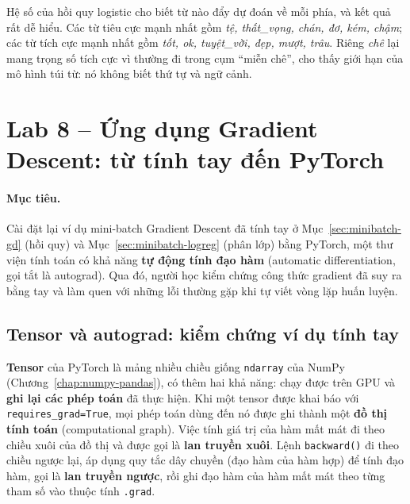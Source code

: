 
Hệ số của hồi quy logistic cho biết từ nào đẩy dự đoán về mỗi phía, và kết quả rất dễ hiểu. Các từ tiêu cực mạnh nhất gồm \textit{tệ, thất\_vọng, chán, đơ, kém, chậm}; các từ tích cực mạnh nhất gồm \textit{tốt, ok, tuyệt\_vời, đẹp, mượt, trâu}. Riêng \textit{chê} lại mang trọng số tích cực vì thường đi trong cụm ``miễn chê'', cho thấy giới hạn của mô hình túi từ: nó không biết thứ tự và ngữ cảnh.

\section{Lab 8 -- Ứng dụng Gradient Descent: từ tính tay đến PyTorch}
\label{sec:lab-gd}

\paragraph{Mục tiêu.} Cài đặt lại ví dụ mini-batch Gradient Descent đã tính tay ở Mục~\ref{sec:minibatch-gd} (hồi quy) và Mục~\ref{sec:minibatch-logreg} (phân lớp) bằng PyTorch, một thư viện tính toán có khả năng \textbf{tự động tính đạo hàm} (automatic differentiation, gọi tắt là autograd). Qua đó, người học kiểm chứng công thức gradient đã suy ra bằng tay và làm quen với những lỗi thường gặp khi tự viết vòng lặp huấn luyện.

\subsection{Tensor và autograd: kiểm chứng ví dụ tính tay}
\label{sec:torch-autograd}


\textbf{Tensor} của PyTorch là mảng nhiều chiều giống \texttt{ndarray} của NumPy (Chương~\ref{chap:numpy-pandas}), có thêm hai khả năng: chạy được trên GPU và \textbf{ghi lại các phép toán} đã thực hiện. Khi một tensor được khai báo với \texttt{requires\_grad=True}, mọi phép toán dùng đến nó được ghi thành một \textbf{đồ thị tính toán} (computational graph). Việc tính giá trị của hàm mất mát đi theo chiều xuôi của đồ thị và được gọi là \textbf{lan truyền xuôi}. Lệnh \texttt{backward()} đi theo chiều ngược lại, áp dụng quy tắc dây chuyền (đạo hàm của hàm hợp) để tính đạo hàm, gọi là \textbf{lan truyền ngược}, rồi ghi đạo hàm của hàm mất mát theo từng tham số vào thuộc tính \texttt{.grad}.

